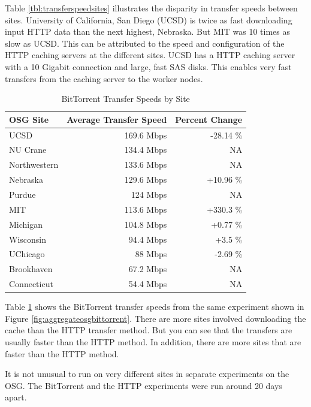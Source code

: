 Table \ref{tbl:transferspeedsites} illustrates the disparity in transfer speeds between sites.  University of California, San Diego (UCSD) is twice as fast downloading input HTTP data than the next highest, Nebraska.  But MIT was 10 times as slow as UCSD.  This can be attributed to the speed and configuration of the HTTP caching servers at the different sites.  UCSD has a HTTP caching server with a 10 Gigabit connection and large, fast SAS disks.  This enables very fast transfers from the caching server to the worker nodes.


\begin{table}[h!t]
\centering
\bgroup
\def\arraystretch{1.5}
\begin{tabular}{l|r|r}
	\textbf{OSG Site} & \textbf{Average Transfer Speed} & \textbf{Percent Change} \\ \hline
	UCSD & 169.6 Mbps & -28.14 \% \\ \hline
	NU Crane & 134.4 Mbps & NA \\ \hline
	Northwestern & 133.6 Mbps & NA \\ \hline
	Nebraska & 129.6 Mbps & +10.96 \% \\ \hline
	Purdue & 124 Mbps & NA \\ \hline
	MIT & 113.6 Mbps & +330.3 \% \\ \hline
	Michigan & 104.8 Mbps & +0.77 \% \\ \hline
	Wisconsin & 94.4 Mbps & +3.5 \% \\ \hline
	UChicago & 88 Mbps & -2.69 \% \\ \hline
	Brookhaven & 67.2 Mbps & NA \\ \hline
	Connecticut & 54.4 Mbps & NA \\ \hline
	
\end{tabular}
\egroup
\caption{BitTorrent Transfer Speeds by Site}
\label{tbl:bittorrenttransferspeedsites}
\end{table}



Table \ref{tbl:bittorrenttransferspeedsites} shows the BitTorrent transfer speeds from the same experiment shown in Figure \ref{fig:aggregateosgbittorrent}.  There are more sites involved downloading the cache than the HTTP transfer method.  But you can see that the transfers are usually faster than the HTTP method.  In addition, there are more sites that are faster than the  HTTP method.

It is not unusual to run on very different sites in separate experiments on the OSG.  The BitTorrent and the HTTP experiments were run around 20 days apart.

